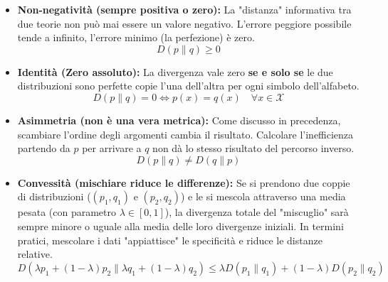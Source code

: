 \begin{itemize}
    \item \textbf{Non-negatività (sempre positiva o zero):} La "distanza" informativa tra due teorie non può mai essere un valore negativo. L'errore peggiore possibile tende a infinito, l'errore minimo (la perfezione) è zero.
    \begin{equation*}
        D(p \parallel q) \ge 0
    \end{equation*}
    
    \item \textbf{Identità (Zero assoluto):} La divergenza vale zero \textbf{se e solo se} le due distribuzioni sono perfette copie l'una dell'altra per ogni simbolo dell'alfabeto.
    \begin{equation*}
        D(p \parallel q) = 0 \iff p(x) = q(x) \quad \forall x \in \mathcal{X}
    \end{equation*}
    
    \item \textbf{Asimmetria (non è una vera metrica):} Come discusso in precedenza, scambiare l'ordine degli argomenti cambia il risultato. Calcolare l'inefficienza partendo da $p$ per arrivare a $q$ non dà lo stesso risultato del percorso inverso.
    \begin{equation*}
        D(p \parallel q) \neq D(q \parallel p)
    \end{equation*}
    
    \item \textbf{Convessità (mischiare riduce le differenze):} Se si prendono due coppie di distribuzioni ($(p_1, q_1)$ e $(p_2, q_2)$) e le si mescola attraverso una media pesata (con parametro $\lambda \in [0,1]$), la divergenza totale del "miscuglio" sarà sempre minore o uguale alla media delle loro divergenze iniziali. In termini pratici, mescolare i dati "appiattisce" le specificità e riduce le distanze relative.
    \begin{equation*}
        D(\lambda p_1 + (1-\lambda)p_2 \parallel \lambda q_1 + (1-\lambda)q_2) \le \lambda D(p_1 \parallel q_1) + (1-\lambda)D(p_2 \parallel q_2)
    \end{equation*}
\end{itemize}